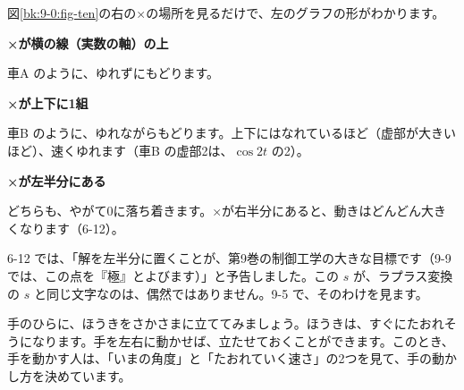 図\ref{bk:9-0:fig-ten}の右の×の場所を見るだけで、左のグラフの形がわかります。
\begin{enumerate}[label={\bkcircled[\bkTT]{\arabic*}}, leftmargin=2.4\zw, itemsep=2pt, topsep=2pt]
\item \textbf{×が横の線（実数の軸）の上}\par\nobreak\noindent 車A のように、ゆれずにもどります。
\item \textbf{×が上下に1組}\par\nobreak\noindent 車B のように、ゆれながらもどります。上下にはなれているほど（虚部が大きいほど）、速くゆれます（車B の虚部2は、$\cos2t$ の2）。
\item \textbf{×が左半分にある}\par\nobreak\noindent どちらも、やがて0に落ち着きます。×が右半分にあると、動きはどんどん大きくなります（6-12）。
\end{enumerate}

6-12 では、「解を左半分に置くことが、第9巻の制御工学の大きな目標です（9-9 では、この点を『極』とよびます）」と予告しました。この $s$ が、ラプラス変換の $s$ と同じ文字なのは、偶然ではありません。9-5 で、そのわけを見ます。


\label{bk:9-0:gyoretsu}手のひらに、ほうきをさかさまに立ててみましょう。ほうきは、すぐにたおれそうになります。手を左右に動かせば、立たせておくことができます。このとき、手を動かす人は、「いまの角度」と「たおれていく速さ」の2つを見て、手の動かし方を決めています。

